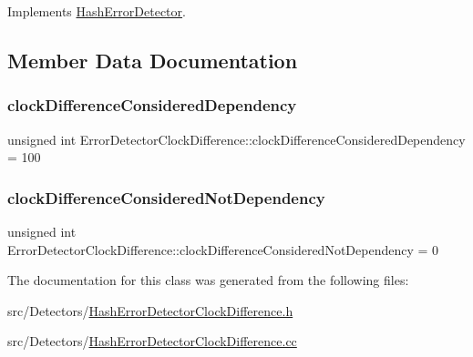 Implements \hyperlink{classHashErrorDetector_ad7419eaab728b7ed3e394d5aee9eda41}{Hash\+Error\+Detector}.



\subsection{Member Data Documentation}
\mbox{\label{classErrorDetectorClockDifference_a0d2a3c4111e8bb4b3c232aacca9a0062}} 
\subsubsection{\texorpdfstring{clock\+Difference\+Considered\+Dependency}{clockDifferenceConsideredDependency}}
{\footnotesize\ttfamily unsigned int Error\+Detector\+Clock\+Difference\+::clock\+Difference\+Considered\+Dependency = 100\hspace{0.3cm}{\ttfamily [private]}}

\mbox{\label{classErrorDetectorClockDifference_aa733fc7d2023d62a7418ca20e01e9f5a}} 
\subsubsection{\texorpdfstring{clock\+Difference\+Considered\+Not\+Dependency}{clockDifferenceConsideredNotDependency}}
{\footnotesize\ttfamily unsigned int Error\+Detector\+Clock\+Difference\+::clock\+Difference\+Considered\+Not\+Dependency = 0\hspace{0.3cm}{\ttfamily [private]}}



The documentation for this class was generated from the following files\+:\begin{DoxyCompactItemize}
\item 
src/\+Detectors/\hyperlink{HashErrorDetectorClockDifference_8h}{Hash\+Error\+Detector\+Clock\+Difference.\+h}\item 
src/\+Detectors/\hyperlink{HashErrorDetectorClockDifference_8cc}{Hash\+Error\+Detector\+Clock\+Difference.\+cc}\end{DoxyCompactItemize}

